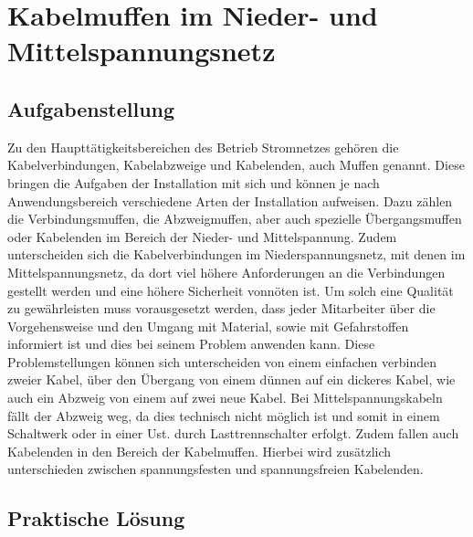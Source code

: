 \chapter{Kabelmuffen im Nieder- und Mittelspannungsnetz}
\label{cha:Kabelmuffen}

\section{Aufgabenstellung}

Zu den Haupttätigkeitsbereichen des Betrieb Stromnetzes gehören die Kabelverbindungen, Kabelabzweige und Kabelenden, auch Muffen genannt. Diese bringen 
die Aufgaben der Installation mit sich und können je nach Anwendungsbereich verschiedene Arten der Installation aufweisen. Dazu zählen \zB die 
Verbindungsmuffen, die Abzweigmuffen, aber auch spezielle Übergangsmuffen oder Kabelenden im Bereich der Nieder- und Mittelspannung. Zudem unterscheiden 
sich die Kabelverbindungen im Niederspannungsnetz, mit denen im Mittelspannungsnetz, da dort viel höhere Anforderungen an die Verbindungen gestellt 
werden und eine höhere Sicherheit vonnöten ist. Um solch eine Qualität zu gewährleisten muss vorausgesetzt werden, dass jeder Mitarbeiter über die 
Vorgehensweise und den Umgang mit Material, sowie mit Gefahrstoffen informiert ist und dies bei seinem Problem anwenden kann. Diese Problemstellungen 
können sich unterscheiden von einem einfachen verbinden zweier Kabel, über den Übergang von einem dünnen auf ein dickeres Kabel, wie auch ein Abzweig 
von einem auf zwei neue Kabel. Bei Mittelspannungskabeln fällt der Abzweig weg, da dies technisch nicht möglich ist und somit in einem Schaltwerk oder 
in einer Ust. durch Lasttrennschalter erfolgt. Zudem fallen auch Kabelenden in den Bereich der Kabelmuffen. Hierbei wird zusätzlich unterschieden 
zwischen spannungsfesten und spannungsfreien Kabelenden. 

\section{Praktische Lösung}

